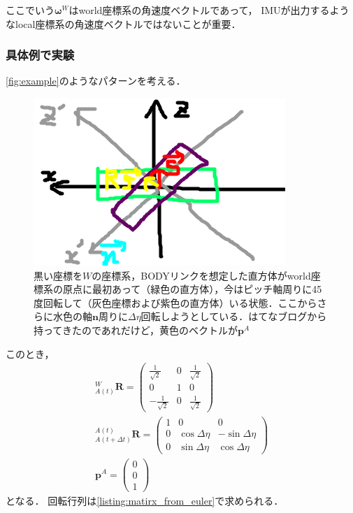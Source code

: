 ここでいう$\boldsymbol{\omega}^{W}$はworld座標系の角速度ベクトルであって，
IMUが出力するようなlocal座標系の角速度ベクトルではないことが重要．

\subsubsection{具体例で実験}\label{subsubsec:test1}
\autoref{fig:example}のようなパターンを考える．
\begin{figure}[ht]
  \centering
  \includegraphics[width=0.8\columnwidth]{figs/section1/example}
  \caption{黒い座標を$W$の座標系，BODYリンクを想定した直方体がworld座標系の原点に最初あって（緑色の直方体），今はピッチ軸周りに45度回転して（灰色座標および紫色の直方体）いる状態．ここからさらに水色の軸$\boldsymbol{n}$周りに$\Delta \eta$回転しようとしている．はてなブログから持ってきたのであれだけど，黄色のベクトルが$\boldsymbol{p}^{A}$}
  \label{fig:example}
\end{figure}
このとき，
\begin{gather}
  {}^{W}_{A(t)}\boldsymbol{R} = \begin{pmatrix}
    \frac{1}{\sqrt{2}} & 0 & \frac{1}{\sqrt{2}}\\
    0 & 1 & 0\\
    -\frac{1}{\sqrt{2}} & 0 & \frac{1}{\sqrt{2}}
  \end{pmatrix}\\
  {}^{A(t)}_{A(t+\Delta t)}\boldsymbol{R} = \begin{pmatrix}
    1 & 0 & 0\\
    0 & \cos \Delta \eta & - \sin \Delta \eta\\
    0 & \sin \Delta \eta &   \cos \Delta \eta
  \end{pmatrix}\\
  \boldsymbol{p}^{A} = \begin{pmatrix}
    0\\
    0\\
    1
  \end{pmatrix}
\end{gather}
となる．
回転行列は\autoref{listing:matirx_from_euler}で求められる．

